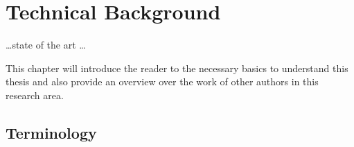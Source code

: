 \chapter{Technical Background}
\label{sec:state}






\ldots state of the art \ldots


This chapter will introduce the reader to the necessary basics to understand
this thesis and also provide an overview over the work of other authors in this
research area.

\section{Terminology}


